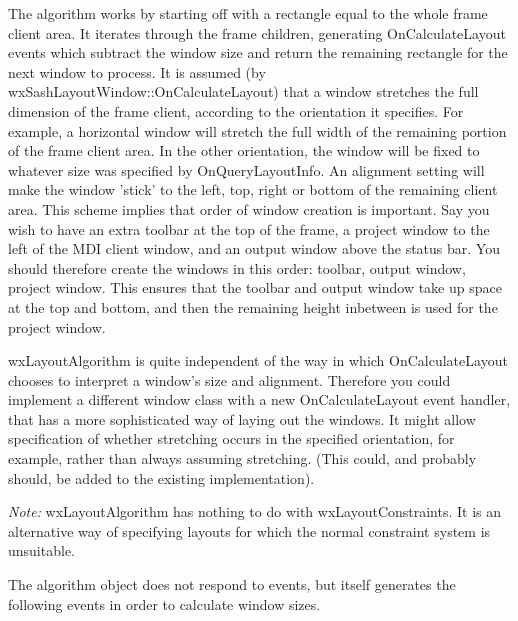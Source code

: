 The algorithm works by starting off with a rectangle equal to the whole frame client area.
It iterates through the frame children, generating OnCalculateLayout events which subtract
the window size and return the remaining rectangle for the next window to process. It
is assumed (by wxSashLayoutWindow::OnCalculateLayout) that a window stretches the full dimension
of the frame client, according to the orientation it specifies. For example, a horizontal window
will stretch the full width of the remaining portion of the frame client area.
In the other orientation, the window will be fixed to whatever size was specified by
OnQueryLayoutInfo. An alignment setting will make the window 'stick' to the left, top, right or
bottom of the remaining client area. This scheme implies that order of window creation is important.
Say you wish to have an extra toolbar at the top of the frame, a project window to the left of
the MDI client window, and an output window above the status bar. You should therefore create
the windows in this order: toolbar, output window, project window. This ensures that the toolbar and
output window take up space at the top and bottom, and then the remaining height inbetween is used for
the project window.

wxLayoutAlgorithm is quite independent of the way in which
OnCalculateLayout chooses to interpret a window's size and alignment. Therefore you
could implement a different window class with a new OnCalculateLayout event handler,
that has a more sophisticated way of laying out the windows. It might allow
specification of whether stretching occurs in the specified orientation, for example,
rather than always assuming stretching. (This could, and probably should, be added to the existing
implementation).

{\it Note:} wxLayoutAlgorithm has nothing to do with wxLayoutConstraints. It is an alternative
way of specifying layouts for which the normal constraint system is unsuitable.




The algorithm object does not respond to events, but itself generates the
following events in order to calculate window sizes.

\twocolwidtha{7cm}%
\begin{twocollist}\itemsep=0pt
\end{twocollist}

